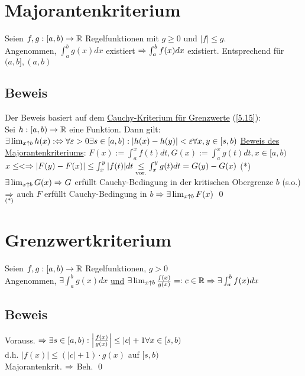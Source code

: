 \newpage

\section{Majorantenkriterium}\label{14.17}
Seien $f,g: [a,b) \to \mathbb{R}$ Regelfunktionen mit $g \ge 0$ und $|f| \le g$.\\
Angenommen, $\int_a^b g(x) dx$ existiert $\Rightarrow \int_a^b f(x) dx$ existiert.\nl
Entsprechend für $(a,b], (a,b)$

\subsection*{Beweis}
Der Beweis basiert auf dem \underline{Cauchy-Kriterium für Grenzwerte} (\ref{5.15}):\\
Sei $h: [a,b) \to \mathbb{R}$ eine Funktion. Dann gilt: $\exists \lim_{x \uparrow b} h(x) :\Leftrightarrow \forall \varepsilon > 0 \exists s \in [a,b): |h(x)-h(y)| < \varepsilon \forall x,y \in [s,b)$\nl
\underline{Beweis des Majorantenkriteriums}: $F(x) := \int_a^x f(t) dt, G(x) := \int_a^x g(t) dt, x \in [a,b)$\\
$x \le < \Rightarrow |F(y)-F(x)| \le \int_x^y |f(t)| dt \underset{\text{vor.}}{\le} \int_x^y g(t) dt = G(y)-G(x)$ (*)\nl
$\exists \lim_{x \uparrow b} G(x) \Rightarrow G$ erfüllt Cauchy-Bedingung in der kritischen Obergrenze $b$ (s.o.)\\
$\underset{\text{(*)}}{\Rightarrow}$ auch $F$ erfüllt Cauchy-Bedingung in $b \Rightarrow \exists \lim_{x \uparrow b} F(x)$ \qed

\section{Grenzwertkriterium}\label{14.18}
Seien $f,g: [a,b) \to \mathbb{R}$ Regelfunktionen, $g > 0$\\
Angenommen, $\exists \int_a^b g(x) dx$ \underline{und} $\exists \lim_{x \uparrow b} \frac{f(x)}{g(x)} =: c \in \mathbb{R} \Rightarrow \exists \int_a^b f(x) dx$

\subsection*{Beweis}
Vorauss. $\Rightarrow \exists s \in [a,b): \left|\frac{f(x)}{g(x)}\right| \le |c|+1 \forall x \in [s,b)$\\
d.h. $|f(x)| \le (|c|+1) \cdot g(x)$ auf $[s,b)$\\
Majorantenkrit. $\Rightarrow$ Beh. \qed